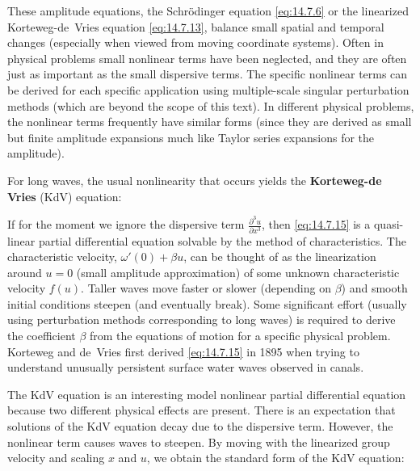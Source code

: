 These amplitude equations, the Schr\"odinger equation \eqref{eq:14.7.6} or the linearized Korteweg-de~Vries equation \eqref{eq:14.7.13}, balance small spatial and temporal changes (especially when viewed from moving coordinate systems).  Often in physical problems small nonlinear terms have been neglected, and they are often just as important as the small dispersive terms.  The specific nonlinear terms can be derived for each specific application using multiple-scale singular perturbation methods (which are beyond the scope of this text).  In different physical problems, the nonlinear terms frequently have similar forms (since they are derived as small but finite amplitude expansions much like Taylor series expansions for the amplitude).

For long waves, the usual nonlinearity that occurs yields the \textbf{Korteweg-de Vries} (KdV) equation:

If for the moment we ignore the dispersive term $\frac{\partial^3 u}{\partial x^3}$, then \eqref{eq:14.7.15} is a quasi-linear partial differential equation solvable by the method of characteristics.  The characteristic velocity, $\omega'(0) + \beta u$, can be thought of as the linearization around $u = 0$ (small amplitude approximation) of some unknown characteristic velocity $f(u)$.  Taller waves move faster or slower (depending on $\beta$) and smooth initial conditions steepen (and eventually break).  Some significant effort (usually using perturbation methods corresponding to long waves) is required to derive the coefficient $\beta$ from the equations of motion for a specific physical problem.  Korteweg and de~Vries first derived \eqref{eq:14.7.15} in 1895 when trying to understand unusually persistent surface water waves observed in canals.

The KdV equation is an interesting model nonlinear partial differential equation because two different physical effects are present.  There is an expectation that solutions of the KdV equation decay due to the dispersive term.  However, the nonlinear term causes waves to steepen.  By moving with the linearized group velocity and scaling $x$ and $u$, we obtain the standard form of the KdV equation:

